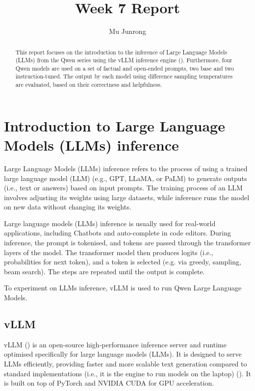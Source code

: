 \documentclass{article} %
\title{Week 7 Report}
\author{Mu Junrong}
\begin{document}
\ifcolmsubmission
\linenumbers
\fi

\maketitle

\begin{abstract}
This report focuses on the introduction to the inference of Large Language Models (LLMs) from the Qwen series using the vLLM inference engine (\cite{vllm2023}). Furthermore, four Qwen models are used on a set of factual and open-ended prompts, two base and two instruction-tuned. The output by each model using difference sampling temperatures are evaluated, based on their correctness and helpfulness. 
\end{abstract}

\section{Introduction to Large Language Models (LLMs) inference}
Large Language Models (LLMs) inference refers to the process of using a trained large language model (LLM) (e.g., GPT, LLaMA, or PaLM) to generate outputs (i.e., text or answers) based on input prompts. The training process of an LLM involves adjusting its weights using large datasets, while inference runs the model on new data without changing its weights.

Large language models (LLMs) inference is usually used for real-world applications, including Chatbots and auto-complete in code editors. During inference, the prompt is tokenised, and tokens are passed through the transformer layers of the model. The transformer model then produces logits (i.e., probabilities for next token), and a token is selected (e.g. via greedy, sampling, beam search). The steps are repeated until the output is complete. 

To experiment on LLMs inference, vLLM is used to run Qwen Large Language Models.

\subsection{vLLM}
vLLM (\cite{vllm2023}) is an open-source high-performance inference server and runtime optimised specifically for large language models (LLMs). It is designed to serve LLMs efficiently, providing faster and more scalable text generation compared to standard implementations (i.e., it is the engine to run models on the laptop) (\cite{dao2022flashattention}). It is built on top of PyTorch and NVIDIA CUDA for GPU acceleration. 
\end{document}
